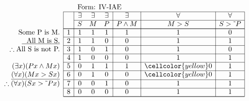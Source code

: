 \documentclass[10pt,legalpaper,landscape,cmtt]{article}
\begin{document}
{\begin{minipage}[t]{3.25in}
	\(
	\begin{array}{r|c|ccc|c|c|c|}
		\multicolumn{2}{c}{}&\multicolumn{6}{l}{\mbox{Form: IV-IAE}} \\ \cline{2-8}
		\hspace{1in}	&	& \exists & \exists & \exists & \exists & \forall & \forall\\ \cline{3-8}
		&	& S & M & P &  P \wedge M  &  M > S  &  S > \tilde~P \\ \cline{2-8} \cline{2-8}
		\phantom{\therefore}\mbox{Some P is M.}   & 1 & 1 & 1 & 1 &   1   &   1   &   0  \\ \cline{2-8}
		\underline{\phantom{\therefore}\mbox{All M is S.}}   & 2 & 1 & 1 & 0 &   0   &   1   &   1  \\ \cline{2-8}
		\therefore \mbox{All S is not P.}   & 3 & 1 & 0 & 1 &   0   &   1   &   0  \\ \cline{2-8}
		& 4 & 1 & 0 & 0 &   0   &   1   &   1  \\ \cline{2-8}
		(\exists x)(Px \wedge Mx)   & 5 & 0 & 1 & 1 &   1   &   \cellcolor{yellow} 0   &   1  \\ \cline{2-8}
		\underline{(\forall x)(Mx > Sx)}   & 6 & 0 & 1 & 0 &   0   &   \cellcolor{yellow} 0   &   1  \\ \cline{2-8}
		\therefore(\forall x)(Sx > \tilde~Px)   & 7 & 0 & 0 & 1 &   0   &   1   &   1  \\ \cline{2-8}
		& 8 & 0 & 0 & 0 &   0   &   1   &   1   \\ \cline{2-8}\cline{2-8} 
	\end{array}
	\)
\end{minipage}

}
\end{document}
